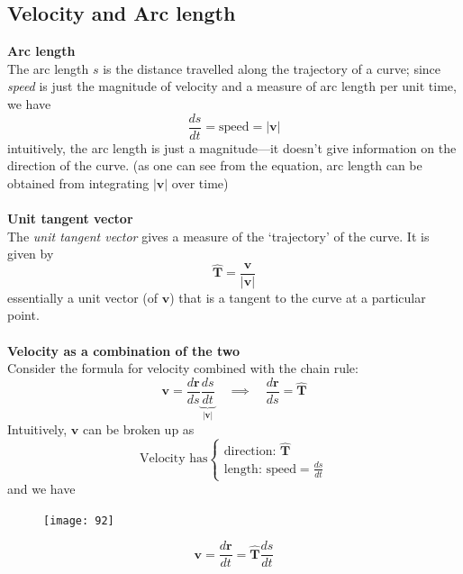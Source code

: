 \documentclass{report}
\begin{document}
\subsection{Velocity and Arc length} %
\textbf{Arc length}\\
The arc length $s$ is the distance travelled along the trajectory of a curve; since \textit{speed} is 
just the magnitude of velocity and a measure of arc length per unit time, we have
\begin{equation*}
\frac{ds}{dt}=\text{speed}=|\bm{v}|
\end{equation*}
intuitively, the arc length is just a magnitude---it doesn't give information on the direction of the curve.
(as one can see from the equation, arc length can be obtained from integrating $|\bm{v}|$ over time)\\
\vspace{1mm}\\
\textbf{Unit tangent vector}\\
The \textit{unit tangent vector} gives a measure of the `trajectory' of the curve. It is given by
\begin{equation*}
\hat{\bm{T}}=\frac{\bm{v}}{|\bm{v}|}
\end{equation*}
essentially a unit vector (of $\bm{v}$) that is a tangent to the curve at a particular point.\\
\vspace{1mm}\\
\textbf{Velocity as a combination of the two}\\
Consider the formula for velocity combined with the chain rule:
\begin{equation*}
\bm{v}=\frac{d\bm{r}}{ds}\underbrace{\frac{ds}{dt}}_{|\bm{v}|}\quad\implies\quad\frac{d\bm{r}}{ds}=\hat{\bm{T}}
\end{equation*}
Intuitively, $\bm{v}$ can be broken up as
\begin{equation*}
\text{Velocity has}\begin{cases}
\text{direction}:\,\hat{\bm{T}}\\
\text{length}:\,\text{speed}=\frac{ds}{dt}
\end{cases}
\end{equation*}
and we have 
\begin{figure}[h]
\begin{center}
\texttt{[image: 92]}\\
\end{center}
\begin{equation*}
\bm{v}=\frac{d\bm{r}}{dt}=\hat{\bm{T}}\frac{ds}{dt}
\end{equation*}
\end{figure}
\newpage
\end{document}
